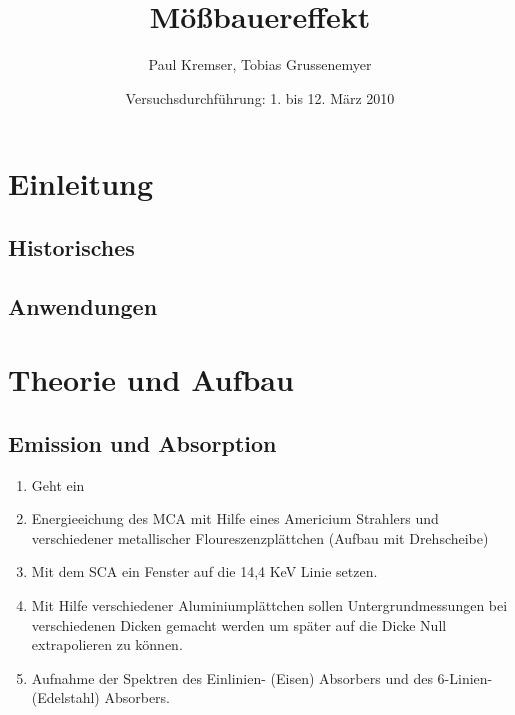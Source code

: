 \documentclass{beamer}
\begin{document}
\title{Mößbauereffekt} 
\author{Paul Kremser, Tobias Grussenemyer}
\date{Versuchsdurchführung: 1. bis 12. März 2010} 

\frame{\titlepage} 


\section{Einleitung}
\subsection{Historisches}
\subsection{Anwendungen}


\section{Theorie und Aufbau}
\subsection{Emission und Absorption}
\begin{enumerate}
 \item Geht ein 
 \item Energieeichung des MCA mit Hilfe eines Americium Strahlers und verschiedener metallischer Floureszenzplättchen (Aufbau mit Drehscheibe)
 \item Mit dem SCA ein Fenster auf die 14,4 KeV Linie setzen.
 \item Mit Hilfe verschiedener Aluminiumplättchen sollen Untergrundmessungen bei verschiedenen Dicken gemacht werden um später auf die Dicke Null extrapolieren zu können.
 \item Aufnahme der Spektren des Einlinien- (Eisen) Absorbers und des 6-Linien- (Edelstahl) Absorbers.
\end{enumerate}
\end{document}
